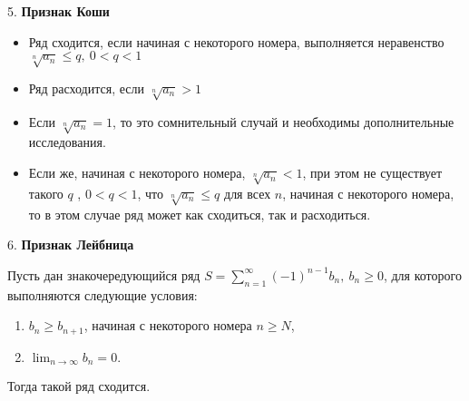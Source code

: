 5. \textbf{Признак Коши}
\begin{itemize}
    \item Ряд сходится, если начиная с некоторого номера, выполняется неравенство
    $\displaystyle \sqrt[{n}]{a_{n}} \leq q,~0<q<1$
    \item Ряд расходится, если ${\displaystyle {\sqrt[{n}]{a_{n}}}>1}$
    \item Если ${\displaystyle {\sqrt[{n}]{a_{n}}}=1}$, то это сомнительный случай и необходимы дополнительные исследования.
    \item Если же, начиная с некоторого номера, 
    ${\displaystyle {\sqrt[{n}]{a_{n}}}<1}$, при этом не существует такого ${\displaystyle q}$ , 
    ${\displaystyle 0<q<1}$, что $ {\displaystyle {\sqrt[{n}]{a_{n}}}\leqslant q}$ для всех ${\displaystyle n}$, 
    начиная с некоторого номера, то в этом случае ряд может как сходиться, так и расходиться.
\end{itemize}

6. \textbf{Признак Лейбница}

Пусть дан знакочередующийся ряд ${\displaystyle S=\sum _{n=1}^{\infty }(-1)^{n-1}b_{n},\ b_{n}\geq 0}$, для которого выполняются следующие условия:
\begin{enumerate}
    \item ${\displaystyle b_{n}\geq b_{n+1}}$, начиная с некоторого номера ${\displaystyle n\geq N}$,
    \item ${\displaystyle \lim _{n\to \infty }b_{n}=0.}$
\end{enumerate}
Тогда такой ряд сходится.

